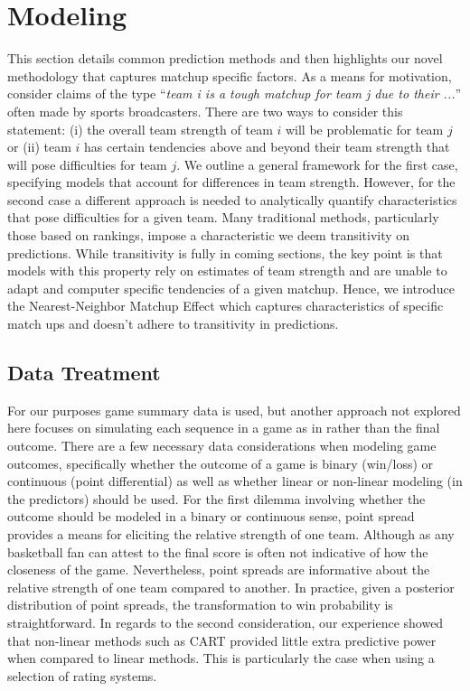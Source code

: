 \section{Modeling}
This section details common prediction methods and then highlights our novel methodology that captures matchup specific factors. As a means for motivation, consider claims of the type ``\emph{team i is a tough matchup for team j due to their ...}'' often made by sports broadcasters. There are two ways to consider this statement: (i) the overall team strength of team $i$ will be problematic for team $j$ or (ii) team $i$ has certain tendencies above and beyond their team strength that will pose difficulties for team $j$. We outline a general framework for the first case, specifying models that account for differences in team strength. However, for the second case a different approach is needed to analytically quantify characteristics that pose difficulties for a given team. Many traditional methods, particularly those based on rankings, impose a characteristic we deem transitivity on predictions. While transitivity is fully in coming sections, the key point is that models with this property rely on estimates of team strength and are unable to adapt and computer specific tendencies of a given matchup. Hence, we introduce the Nearest-Neighbor Matchup Effect which captures characteristics of specific match ups and doesn't adhere to transitivity in predictions.  

\subsection{Data Treatment}
For our purposes game summary data is used, but another approach not explored here focuses on simulating each sequence in a game as in \cite{vstrumbelj2012} rather than the final outcome. There are a few necessary data considerations when modeling game outcomes, specifically whether the outcome of a game is binary (win/loss) or continuous (point differential) as well as whether linear or non-linear modeling (in the predictors) should be used. For the first dilemma involving whether the outcome should be modeled in a binary or continuous sense, point spread provides a means for eliciting the relative strength of one team. Although as any basketball fan can attest to the final score is often not indicative of how the closeness of the game. Nevertheless, point spreads are informative about the relative strength of one team compared to another. In practice, given a posterior distribution of point spreads, the transformation to win probability is straightforward.  In regards to the second consideration, our experience showed that non-linear methods such as CART provided little extra predictive power when compared to linear methods. This is particularly the case when using a selection of rating systems.

